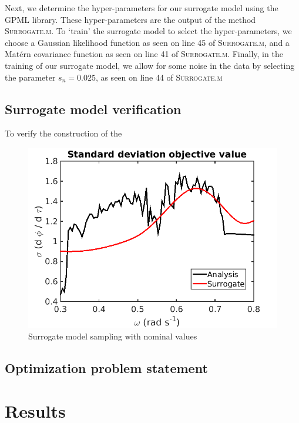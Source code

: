 \documentclass[11pt]{article}
\begin{document}
Next, we determine the hyper-parameters for our surrogate
model using the \textsc{GPML} library. These hyper-parameters
are the output of the method \textsc{Surrogate.m}. To `train'
the surrogate model to select the hyper-parameters, we
choose a Gaussian likelihood function as seen on line
45 of \textsc{Surrogate.m}, and a Mat\'{e}rn covariance
function as seen on line 41 of \textsc{Surrogate.m}.
Finally, in the training of our surrogate model, we allow
for some noise in the data by selecting the parameter
$s_n = 0.025$, as seen on line 44 of \textsc{Surrogate.m}

\subsection{Surrogate model verification}

To verify the construction of the

\begin{figure}[hbt!]
\centering
\includegraphics[width=.5\linewidth]{Verify2}
\caption{Surrogate model sampling with nominal values}
\label{fig:surrogate}
\end{figure}



\subsection{Optimization problem statement}

\section{Results}
\end{document}

